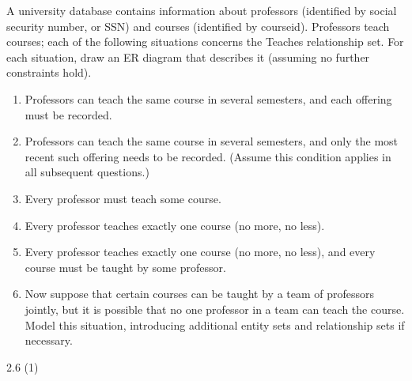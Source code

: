 \begin{problem}{2.2}

  A university database contains information about professors (identified by social security number, or SSN) and
  courses (identified by courseid). Professors teach courses; each of the following situations concerns the Teaches
  relationship set. For each situation, draw an ER diagram that describes it (assuming no further constraints hold).

  \begin{enumerate}
    \item Professors can teach the same course in several semesters, and each offering must be recorded.
    \item Professors can teach the same course in several semesters, and only the most recent such offering needs to be
      recorded. (Assume this condition applies in all subsequent questions.)
    \item Every professor must teach some course.
    \item Every professor teaches exactly one course (no more, no less).
    \item Every professor teaches exactly one course (no more, no less), and every course must be taught by some professor.
    \item Now suppose that certain courses can be taught by a team of professors jointly, but it is possible that no one
      professor in a team can teach the course. Model this situation, introducing additional entity sets and relationship
      sets if necessary.
  \end{enumerate}

  \begin{solution}
    \begin{figure}[H]
      \centering
       \qquad
       \qquad
       \qquad
       \qquad
       \qquad
       \qquad
    \end{figure}
  \end{solution}
\end{problem}
\begin{problem}{2.4}
  \begin{solution}
  \end{solution}
\end{problem}
\begin{problem}{2.6 (1)}
  \begin{solution}
  \end{solution}
\end{problem}
\begin{problem}{2.8}
  \begin{solution}
  \end{solution}
\end{problem}



